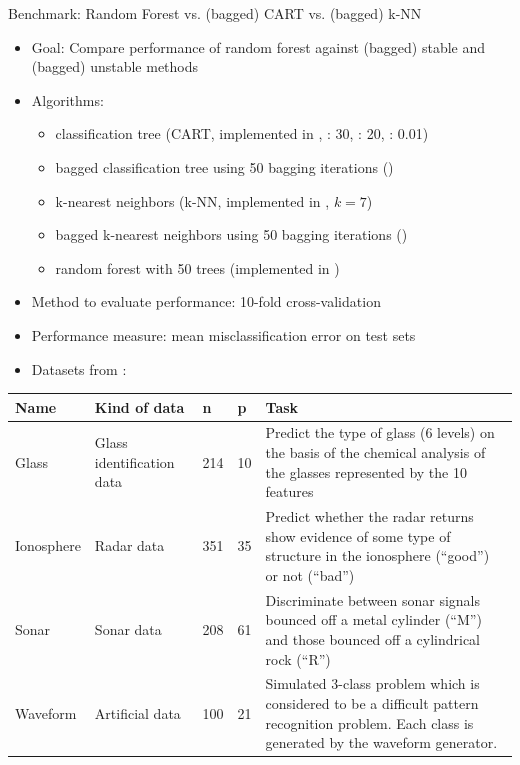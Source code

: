 \begin{vbframe}{Benchmark: Random Forest vs. (bagged) CART vs. (bagged) k-NN}

  \begin{itemize}
    \item Goal: Compare performance of random forest against (bagged) stable and (bagged) unstable methods
    \item Algorithms:
    \begin{itemize}
      \item classification tree (CART, implemented in , : 30, : 20, : 0.01)
      \item bagged classification tree using 50 bagging iterations ()
      \item k-nearest neighbors (k-NN, implemented in , $k=7$)
      \item bagged k-nearest neighbors using 50 bagging iterations ()
      \item random forest with 50 trees (implemented in )
    \end{itemize}
    \item Method to evaluate performance: 10-fold cross-validation
    \item Performance measure: mean misclassification error on test sets
    \end{itemize}

    \framebreak

    \begin{itemize}
    \item Datasets from :
    \end{itemize}

\begin{table}
\footnotesize
\begin{tabular}{p{1.5cm}p{2cm}p{0.5cm}p{0.5cm}p{5cm}}
Name & Kind of data &  n & p & Task\\
\hline
Glass & Glass identification data & 214 & 10 & Predict the type of glass (6 levels) on the basis of the chemical analysis of the glasses represented by the 10 features\\
Ionosphere & Radar data & 351 & 35 & Predict whether the radar returns show evidence of some type of structure in the ionosphere (\enquote{good}) or not (\enquote{bad}) \\
Sonar & Sonar data & 208 & 61 & Discriminate between sonar signals bounced off a metal cylinder (\enquote{M}) and those bounced off a cylindrical rock (\enquote{R})\\
Waveform & Artificial data & 100 & 21 & Simulated 3-class problem which is considered to be a difficult pattern recognition problem. Each class is generated by the waveform generator.\\
\hline
\end{tabular}
\end{table}


\end{vbframe}
